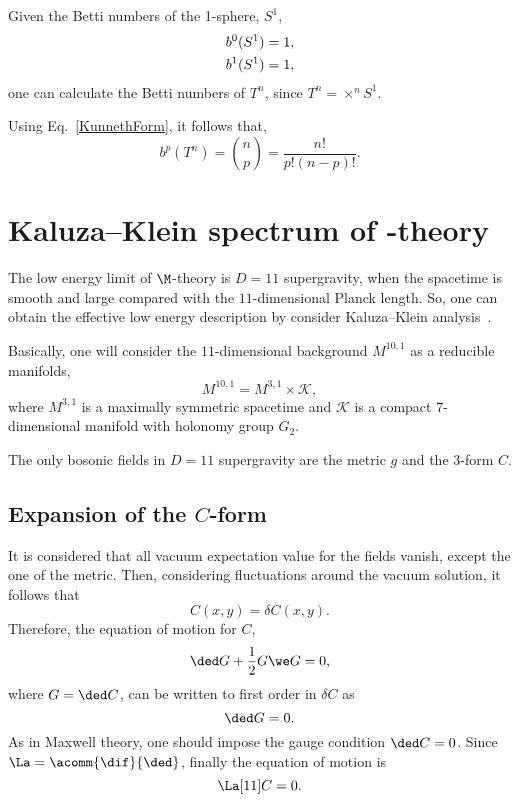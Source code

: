 \begin{WEbox}[frametitle={Betti numbers of a torus ($T^n$)},
  frametitlerule=true,
  frametitlealignment=\centering,
  frametitleaboveskip=10pt,]
  Given the Betti numbers of the 1-sphere, $S^1$,
  \begin{equation}
    \begin{split}      
      b^0(S^1) &= 1, \notag \\
      b^1(S^1) &= 1,
    \end{split}
  \end{equation}
  one can calculate the Betti numbers of $T^n$, since $T^n = \times ^n S^1$.

  Using Eq.~\eqref{KunnethForm}, it follows that,
  \begin{equation}
    b^p(T^n) = \binom{n}{p} = \frac{n!}{p!(n-p)!}.
  \end{equation}
\end{WEbox}


\section{Kaluza--Klein spectrum of \M-theory}

The low energy limit of $\M$-theory is $D = 11$ supergravity, when  the spacetime is smooth and large compared with the $11$-dimensional Planck length. So, one can obtain the effective low energy description by consider Kaluza--Klein analysis~\cite{Papadopoulos:1995da,Acharya:2004qe}. 

Basically, one will consider the $11$-dimensional background $M^{10,1}$ as a reducible manifolds, $$M^{10,1} = M^{3,1} \times \mathcal{K},$$ where $M^{3,1}$ is a maximally symmetric spacetime and $\mathcal{K}$ is a compact $7$-dimensional manifold with holonomy group $G_2$.

The only bosonic fields in $D = 11$ supergravity are the metric $g$ and the $3$-form $C$. 

\subsection{Expansion of the $C$-form}

It is  considered that all vacuum expectation value for  the fields vanish, except the one of the metric. Then, considering fluctuations around the vacuum solution, it follows that
\begin{equation}
  C(x,y) = \delta C(x,y).
\end{equation}
Therefore, the equation of motion for $C$, 
\begin{equation}
  \ded G + \frac{1}{2} G \we G = 0,
  \label{eq:C}
\end{equation}
where $G = \ded C$, can be written to first order in $\delta C$ as
\begin{equation}
  \ded G = 0.
\end{equation}
As in Maxwell theory, one should impose the gauge condition $\ded C = 0$. Since $\La = \acomm{\dif}{\ded}$, finally the equation of motion is
\begin{equation}
  \La[11] C = 0.
\end{equation}

